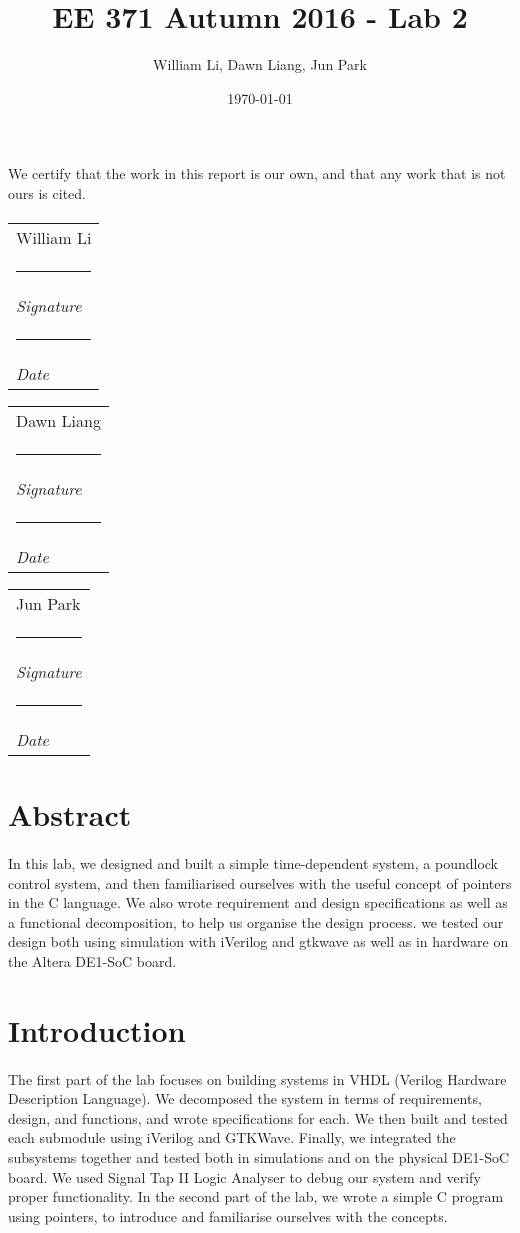 \documentclass{article}
\title{EE 371 Autumn 2016 - Lab 2}
\date{\today}
\author{William Li, Dawn Liang, Jun Park}
\begin{document}
\newcommand{\namesigdate}[2][5cm]{
  \begin{tabular}{@{}p{#1}@{}}
    #2 \\[2\normalbaselineskip] \hrule \\[0pt]
    {\small \textit{Signature}} \\[2\normalbaselineskip] \hrule \\[0pt]
    {\small \textit{Date}}
  \end{tabular}
}

\maketitle
\newpage

\paragraph{} We certify that the work in this report is our own, and that any work that is not ours is cited.
\paragraph{} \noindent \namesigdate{William Li} \hfill \namesigdate{Dawn Liang} \hfill \namesigdate{Jun Park}
\newpage

\tableofcontents
\newpage


\section{Abstract}
\paragraph{} In this lab, we designed and built a simple time-dependent system, a poundlock control system, and then familiarised ourselves with the useful concept of pointers in the C language. We also wrote requirement and design specifications as well as a functional decomposition, to help us organise the design process. we tested our design both using simulation with iVerilog and gtkwave as well as in hardware on the Altera DE1-SoC board.


\section{Introduction}
\paragraph{} The first part of the lab focuses on building systems in VHDL (Verilog Hardware Description Language). We decomposed the system in terms of requirements, design, and functions, and wrote specifications for each. We then built and tested each submodule using iVerilog and GTKWave. Finally, we integrated the subsystems together and tested both in simulations and on the physical DE1-SoC board. We used Signal Tap II Logic Analyser to debug our system and verify proper functionality. In the second part of the lab, we wrote a simple C program using pointers, to introduce and familiarise ourselves with the concepts.
\end{document}
